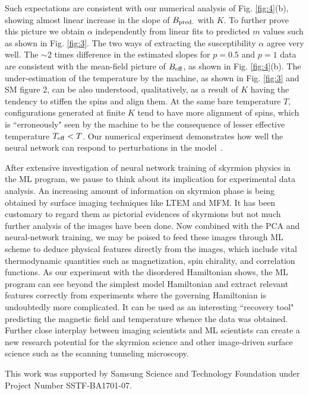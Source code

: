 \documentclass[reprint,amsmath,amssymb,aps,showpacs,superscriptaddress,prl]{revtex4-1}
\begin{document}
Such expectations are consistent with our numerical analysis of Fig. \ref{fig:4}(b), showing almost linear increase in the slope of $B_{\rm pred.}$ with $K$. To further prove this picture we obtain $\alpha$ independently from linear fits to predicted $m$ values such as shown in Fig. \ref{fig:3}. The two ways of extracting the susceptibility $\alpha$ agree very well. The $\sim 2$ times difference in the estimated slopes for $p=0.5$ and $p=1$ data are consistent with the mean-field picture of $B_{\rm eff}$, as shown in Fig. \ref{fig:4}(b). The under-estimation of the temperature by the machine, as shown in Fig. \ref{fig:3} and SM figure 2, can be also understood, qualitatively, as a result of $K$ having the tendency to stiffen the spins and align them. At the same bare temperature $T$, configurations generated at finite $K$ tend to have more alignment of spins, which is ``erroneously" seen by the machine to be the consequence of lesser effective temperature $T_{\rm eff} < T$. Our numerical experiment demonstrates how well the neural network can respond to perturbations in the model~\cite{zhai18b}.

After extensive investigation of neural network training of skyrmion physics in the ML program, we pause to think about its implication for experimental data analysis. An increasing amount of information on skyrmion phase is being obtained by surface imaging techniques like LTEM and MFM. It has been customary to regard them as pictorial evidences of skyrmions but not much further analysis of the images have been done. Now combined with the PCA and neural-network training, we may be poised to feed these images through ML scheme to deduce physical features directly from the images, which include vital thermodynamic quantities such as magnetization, spin chirality, and correlation functions. As our experiment with the disordered Hamiltonian shows, the ML program can see beyond the simplest model Hamiltonian and extract relevant features correctly from experiments where the governing Hamiltonian is undoubtedly more complicated. It can be used as an interesting ``recovery tool" predicting the magnetic field and temperature whence the data was obtained. Further close interplay between imaging scientists and ML scientists can create a new research potential for the skyrmion science and other image-driven surface science such as the scanning tunneling microscopy.

This work was supported by Samsung Science and Technology Foundation under Project Number SSTF-BA1701-07.
\end{document}
